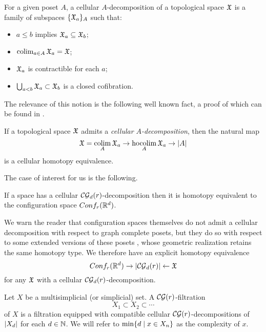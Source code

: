 \begin{definition}
	For a given poset $A$, a cellular $A$-decomposition of a topological space $\mathfrak{X}$ is a family of subspaces $\{\mathfrak{X}_a\}_A$ such that:
	\begin{itemize}
		\item $a \leq b$ implies $\mathfrak{X}_a \subseteq \mathfrak{X}_b$;
		\item $\operatorname*{colim}_{a \in A} \mathfrak{X}_a = \mathfrak{X}$;
		\item $\mathfrak{X}_a$ is contractible for each $a$;
		\item $\bigcup_{a<b} \mathfrak{X}_a \subset \mathfrak{X}_b$ is a closed cofibration.
	\end{itemize}
\end{definition}

The relevance of this notion is the following well known fact, a proof of which can be found in \cite[\S1.7]{berger1997confspacemodel}.

\begin{proposition}\label{p:cellular poset decomposition}
	If a topological space $\mathfrak{X}$ admits a \textit{cellular $A$-decomposition}, then the natural map
	\[
	\mathfrak{X} = \operatorname*{colim}_A \mathfrak{X}_a \to \operatorname*{hocolim}_A \mathfrak{X}_a \to \lvert A\rvert
	\]
	is a cellular homotopy equivalence.
\end{proposition}

The case of interest for us is the following.

\begin{proposition}\label{p:berger}
	If a space has a cellular $\mathcal{CG}_d(r)$-decomposition then it is homotopy equivalent to
	the configuration space $Conf_{r}(\mathbb{R}^{d})$.
\end{proposition}

We warn the reader that configuration spaces themselves do not admit a cellular decomposition with respect to graph complete posets, but they do so with respect to some extended versions of these posets \cite{beuckelmann2021master}, whose geometric realization retains the same homotopy type.
We therefore have an explicit homotopy equivalence
\begin{equation}\label{eq:extended complete graph map}
	Conf_{r}(\mathbb{R}^{d}) \to \lvert\mathcal{CG}_d(r)\rvert \leftarrow \mathfrak{X}
\end{equation}
for any $\mathfrak{X}$ with a cellular $\mathcal{CG}_d(r)$-decomposition.

\begin{definition}
	Let $X$ be a multisimplicial (or simplicial) set.
	A $\mathcal{CG}(r)$-filtration
	\[
	X_1 \subset X_2 \subset \dotsb
	\]
	of $X$ is a filtration equipped with compatible cellular $\mathcal{CG}(r)$-decompositions of $\lvert X_d\rvert$ for each $d \in \mathbb{N}$.
	We will refer to $\min\{d \mid x \in X_n\}$ as the complexity of $x$.
\end{definition}